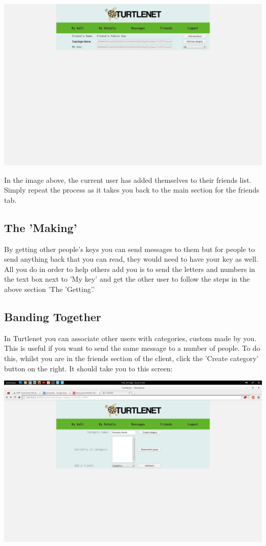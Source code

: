 \includegraphics[scale=0.2]{screenshots/Screenshot from 2014-04-29 22-31-10}

In the image above, the current user has added themselves to their friends list.
Simply repeat the process as it takes you back to the main section for the
friends tab.

\subsection{The 'Making'}
By getting other people's keys you can send messages to them but for people to
send anything back that you can read, they would need to have your key as well.
All you do in order to help others add you is to send the letters and numbers
in the text box next to 'My key' and get the other user to follow the steps in
the above section 'The 'Getting'.'

\subsection{Banding Together}
In Turtlenet you can associate other users with categories, custom made by you.
This is useful if you want to send the same message to a number of people.
To do this, whilst you are in the friends section of the client, click the 
'Create category' button on the right. It should take you to this screen:

\includegraphics[scale=0.2]{screenshots/new6}


